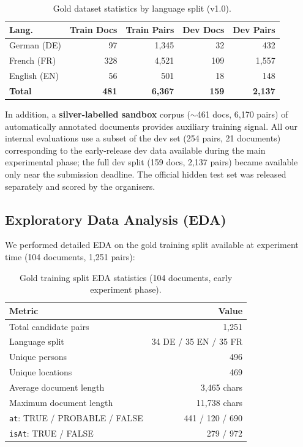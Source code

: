 \documentclass{ceurart}
\begin{document}
\begin{table}[ht]
  \caption{Gold dataset statistics by language split (v1.0).}
  \label{tab:data}
  \centering
  \begin{tabular}{lrrrr}
    \toprule
    \textbf{Lang.} & \textbf{Train Docs} & \textbf{Train Pairs} & \textbf{Dev Docs} & \textbf{Dev Pairs} \\
    \midrule
    German (DE)  & 97  & 1,345 & 32  & 432   \\
    French (FR)  & 328 & 4,521 & 109 & 1,557 \\
    English (EN) & 56  & 501   & 18  & 148   \\
    \midrule
    \textbf{Total} & \textbf{481} & \textbf{6,367} & \textbf{159} & \textbf{2,137} \\
    \bottomrule
  \end{tabular}
\end{table}

In addition, a \textbf{silver-labelled sandbox} corpus ($\sim$461 docs, 6,170 pairs) of automatically annotated documents provides auxiliary training signal. All our internal evaluations use a subset of the dev set (254 pairs, 21 documents) corresponding to the early-release dev data available during the main experimental phase; the full dev split (159 docs, 2,137 pairs) became available only near the submission deadline. The official hidden test set was released separately and scored by the organisers.

\subsection{Exploratory Data Analysis (EDA)}

We performed detailed EDA on the gold training split available at experiment time (104 documents, 1,251 pairs):

\begin{table}[ht]
  \caption{Gold training split EDA statistics (104 documents, early experiment phase).}
  \label{tab:eda}
  \centering
  \begin{tabular}{lr}
    \toprule
    \textbf{Metric} & \textbf{Value} \\
    \midrule
    Total candidate pairs & 1,251 \\
    Language split & 34 DE / 35 EN / 35 FR \\
    Unique persons & 496 \\
    Unique locations & 469 \\
    Average document length & 3,465 chars \\
    Maximum document length & 11,738 chars \\
    \texttt{at}: TRUE / PROBABLE / FALSE & 441 / 120 / 690 \\
    \texttt{isAt}: TRUE / FALSE & 279 / 972 \\
    \bottomrule
  \end{tabular}
\end{table}
\end{document}
